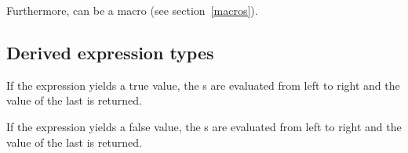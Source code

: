 \begin{entry}{%
}
\saut
{\doc} Furthermore,  can be a macro (see section~\ref{macros}).
\end{entry}

\begin{entry}{%
 {\exprtype}
}
\saut
\doc
\end{entry}

\subsection{Derived expression types}

\begin{entry}{%
}
\saut
\doc
\end{entry}

\begin{entry}{%
}
\saut
If the  expression yields a true value, the s are
evaluated from left to right and the value of the last  is
returned.
\end{entry}

\begin{entry}{%
            {\exprtype}}
\saut
If the  expression yields a false value, the s are
evaluated from left to right and the value of the last  is
returned.
\end{entry}

\begin{entry}{%
}
\saut
\doc
\end{entry}

